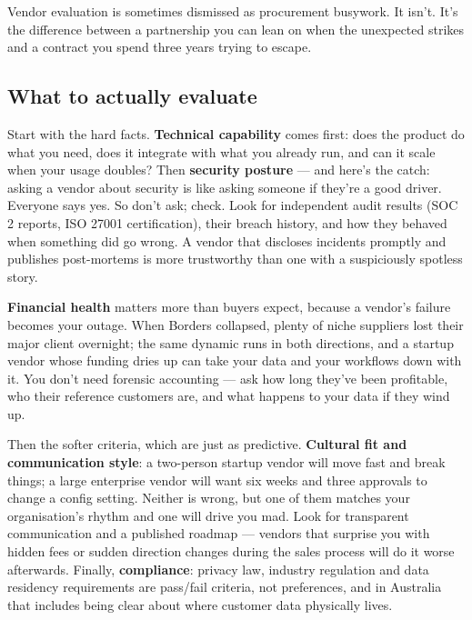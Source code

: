 Vendor evaluation is sometimes dismissed as procurement busywork. It isn't. It's the difference between a partnership you can lean on when the unexpected strikes and a contract you spend three years trying to escape.



\subsection{What to actually evaluate}


Start with the hard facts. \textbf{Technical capability} comes first: does the product do what you need, does it integrate with what you already run, and can it scale when your usage doubles? Then \textbf{security posture} — and here's the catch: asking a vendor about security is like asking someone if they're a good driver. Everyone says yes. So don't ask; check. Look for independent audit results (SOC 2 reports, ISO 27001 certification), their breach history, and how they behaved when something did go wrong. A vendor that discloses incidents promptly and publishes post-mortems is more trustworthy than one with a suspiciously spotless story.


\textbf{Financial health} matters more than buyers expect, because a vendor's failure becomes your outage. When Borders collapsed, plenty of niche suppliers lost their major client overnight; the same dynamic runs in both directions, and a startup vendor whose funding dries up can take your data and your workflows down with it. You don't need forensic accounting — ask how long they've been profitable, who their reference customers are, and what happens to your data if they wind up.


Then the softer criteria, which are just as predictive. \textbf{Cultural fit and communication style}: a two-person startup vendor will move fast and break things; a large enterprise vendor will want six weeks and three approvals to change a config setting. Neither is wrong, but one of them matches your organisation's rhythm and one will drive you mad. Look for transparent communication and a published roadmap — vendors that surprise you with hidden fees or sudden direction changes during the sales process will do it worse afterwards. Finally, \textbf{compliance}: privacy law, industry regulation and data residency requirements are pass/fail criteria, not preferences, and in Australia that includes being clear about where customer data physically lives.



